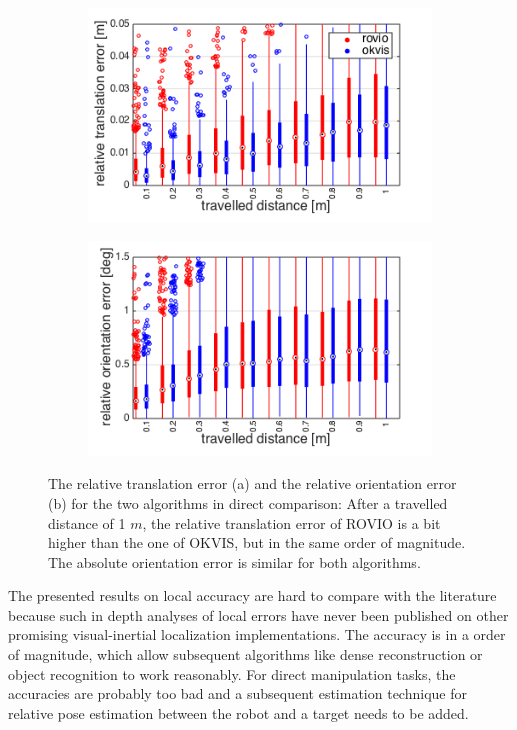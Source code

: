 \begin{figure}[h]
  \begin{subfigure}[b]{0.48\textwidth}
    \includegraphics[width=\textwidth]{images/ijrr/rte.png}
    \caption{}
    \label{fig:2}
  \end{subfigure}
  \hfill
  \begin{subfigure}[b]{0.48\textwidth}
    \includegraphics[width=\textwidth]{images/ijrr/roe.png}
    \caption{}
    \label{fig:2}
  \end{subfigure}
   \caption{The relative translation error (a) and the relative orientation error (b) for the two algorithms in direct comparison: After a travelled distance of 1 $m$, the relative translation error of ROVIO is a bit higher than the one of OKVIS, but in the same order of magnitude. The absolute orientation error is similar for both algorithms.}
   \label{pics:ijrr_rel}
\end{figure}

The presented results on local accuracy are hard to compare with the literature because such in depth analyses of local errors have never been published on other promising visual-inertial localization implementations. The accuracy is in a order of magnitude, which allow subsequent algorithms like dense reconstruction or object recognition to work reasonably. For direct manipulation tasks, the accuracies are probably too bad and a subsequent estimation technique for relative pose estimation between the robot and a target needs to be added.


